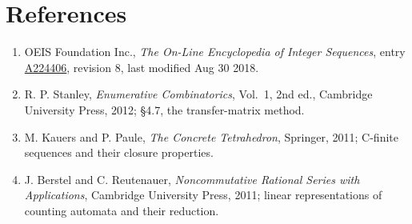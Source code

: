 \documentclass[11pt]{article}
\theoremstyle{definition}
\begin{document}
\section{References}

\begin{enumerate}

\item OEIS Foundation Inc., \emph{The On-Line Encyclopedia of Integer Sequences}, entry \href{https://oeis.org/A224406}{A224406}, revision 8, last modified Aug 30 2018.

\item R. P. Stanley, \emph{Enumerative Combinatorics}, Vol.~1, 2nd ed., Cambridge University Press, 2012; \S4.7, the transfer-matrix method.

\item M. Kauers and P. Paule, \emph{The Concrete Tetrahedron}, Springer, 2011; C-finite sequences and their closure properties.

\item J. Berstel and C. Reutenauer, \emph{Noncommutative Rational Series with Applications}, Cambridge University Press, 2011; linear representations of counting automata and their reduction.

\end{enumerate}
\end{document}
